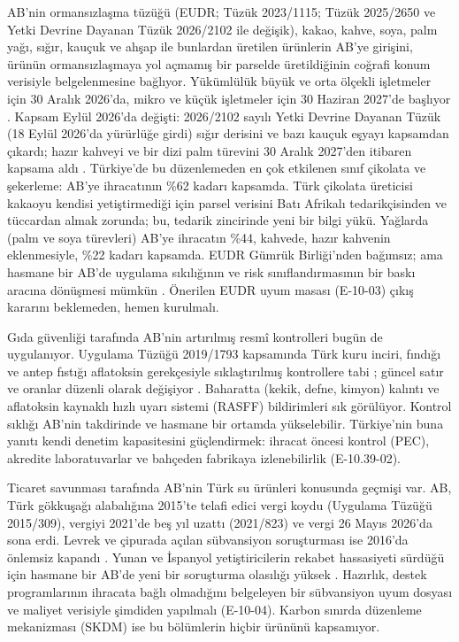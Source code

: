 AB'nin ormansızlaşma tüzüğü (EUDR; Tüzük 2023/1115; Tüzük 2025/2650 ve Yetki Devrine Dayanan Tüzük 2026/2102 ile değişik), kakao, kahve, soya, palm yağı, sığır, kauçuk ve ahşap ile bunlardan üretilen ürünlerin AB'ye girişini, ürünün ormansızlaşmaya yol açmamış bir parselde üretildiğinin coğrafi konum verisiyle belgelenmesine bağlıyor. Yükümlülük büyük ve orta ölçekli işletmeler için 30 Aralık 2026'da, mikro ve küçük işletmeler için 30 Haziran 2027'de başlıyor \etiketV{}. Kapsam Eylül 2026'da değişti: 2026/2102 sayılı Yetki Devrine Dayanan Tüzük (18 Eylül 2026'da yürürlüğe girdi) sığır derisini ve bazı kauçuk eşyayı kapsamdan çıkardı; hazır kahveyi ve bir dizi palm türevini 30 Aralık 2027'den itibaren kapsama aldı \etiketV{}. Türkiye'de bu düzenlemeden en çok etkilenen sınıf çikolata ve şekerleme: AB'ye ihracatının \%62 kadarı kapsamda. Türk çikolata üreticisi kakaoyu kendisi yetiştirmediği için parsel verisini Batı Afrikalı tedarikçisinden ve tüccardan almak zorunda; bu, tedarik zincirinde yeni bir bilgi yükü. Yağlarda (palm ve soya türevleri) AB'ye ihracatın \%44, kahvede, hazır kahvenin eklenmesiyle, \%22 kadarı kapsamda. EUDR Gümrük Birliği'nden bağımsız; ama hasmane bir AB'de uygulama sıkılığının ve risk sınıflandırmasının bir baskı aracına dönüşmesi mümkün \etiketH{}. Önerilen EUDR uyum masası (E-10-03) çıkış kararını beklemeden, hemen kurulmalı.

Gıda güvenliği tarafında AB'nin artırılmış resmî kontrolleri bugün de uygulanıyor. Uygulama Tüzüğü 2019/1793 kapsamında Türk kuru inciri, fındığı ve antep fıstığı aflatoksin gerekçesiyle sıklaştırılmış kontrollere tabi \etiketV{}; güncel satır ve oranlar düzenli olarak değişiyor \etiketD{}. Baharatta (kekik, defne, kimyon) kalıntı ve aflatoksin kaynaklı hızlı uyarı sistemi (RASFF) bildirimleri sık görülüyor. Kontrol sıklığı AB'nin takdirinde ve hasmane bir ortamda yükselebilir. Türkiye'nin buna yanıtı kendi denetim kapasitesini güçlendirmek: ihracat öncesi kontrol (PEC), akredite laboratuvarlar ve bahçeden fabrikaya izlenebilirlik (E-10.39-02).

Ticaret savunması tarafında AB'nin Türk su ürünleri konusunda geçmişi var. AB, Türk gökkuşağı alabalığına 2015'te telafi edici vergi koydu (Uygulama Tüzüğü 2015/309), vergiyi 2021'de beş yıl uzattı (2021/823) ve vergi 26 Mayıs 2026'da sona erdi. Levrek ve çipurada açılan sübvansiyon soruşturması ise 2016'da önlemsiz kapandı \etiketV{}. Yunan ve İspanyol yetiştiricilerin rekabet hassasiyeti sürdüğü için hasmane bir AB'de yeni bir soruşturma olasılığı yüksek \etiketH{}. Hazırlık, destek programlarının ihracata bağlı olmadığını belgeleyen bir sübvansiyon uyum dosyası ve maliyet verisiyle şimdiden yapılmalı (E-10-04). Karbon sınırda düzenleme mekanizması (SKDM) ise bu bölümlerin hiçbir ürününü kapsamıyor.

